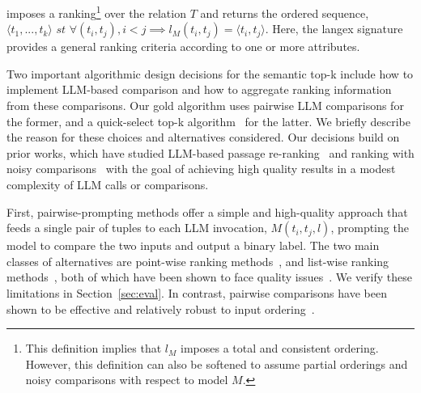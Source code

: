  imposes a ranking\footnote{This definition implies that $l_M$ imposes a total and consistent ordering. However, this definition can also be softened to assume partial orderings and noisy comparisons with respect to model $M$.} over the relation $T$ and returns the ordered sequence, $\langle t_1, ..., t_k\rangle  \textit{ st } \forall (t_i, t_j), i < j \implies  l_M(t_i, t_j) = \langle t_i, t_j\rangle$. Here, the langex signature provides a general ranking criteria according to one or more attributes.
 

Two important algorithmic design decisions for the semantic top-k include how to implement LLM-based comparison and how to aggregate ranking information from these comparisons. Our gold algorithm uses pairwise LLM comparisons for the former, and a quick-select top-k algorithm~\cite{hoare_algorithm_1961} for the latter. We briefly describe the reason for these choices and alternatives considered. 
Our decisions build on prior works, which have studied LLM-based passage re-ranking~\cite{desai_calibration_2020, drozdov_parade_2023, liang_holistic_2022, ma_zero-shot_2023, pradeep_rankvicuna_2023, pradeep_rankzephyr_2023, qin_large_2024, sachan_improving_2022, sun_is_2023} and ranking with noisy comparisons~\cite{shah_simple_2016, braverman_noisy_nodate} with the goal of achieving high quality results in a modest complexity of LLM calls or comparisons. 


First, pairwise-prompting methods offer a simple and high-quality approach that feeds a single pair of tuples to each LLM invocation, $M(t_i, t_j, l)$, prompting the model to compare the two inputs and output a binary label. The two main classes of alternatives are point-wise ranking methods~\cite{desai_calibration_2020, drozdov_parade_2023, liang_holistic_2022, sachan_improving_2022, wu_stark_2024}, and list-wise ranking methods~\cite{ma_zero-shot_2023, pradeep_rankvicuna_2023, pradeep_rankzephyr_2023, sun_is_2023}, both of which have been shown to face quality issues~\cite{sun_is_2023, qin_large_2024, desai_calibration_2020}. We verify these limitations in Section~\ref{sec:eval}. In contrast, pairwise comparisons have been shown to be effective and relatively robust to input ordering~\cite{qin_large_2024}. 

